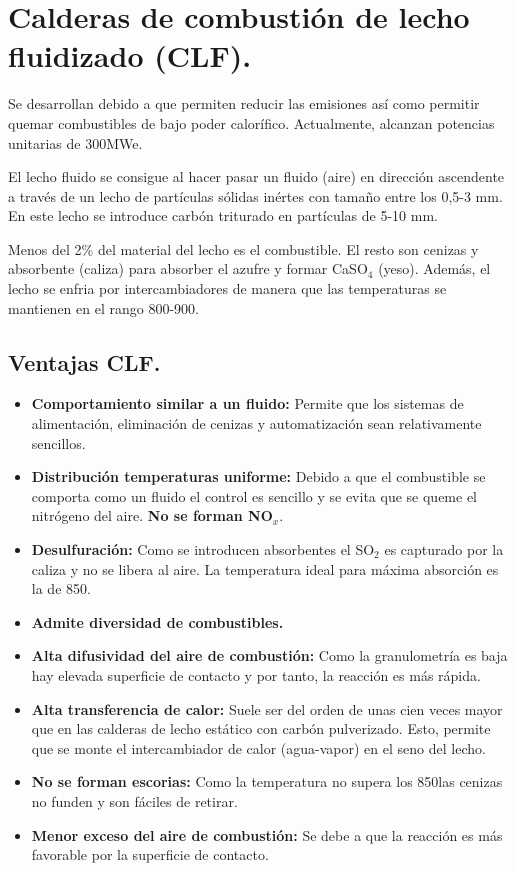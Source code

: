 \section{Calderas de combustión de lecho fluidizado (CLF).}
Se desarrollan debido a que permiten reducir las emisiones así como permitir quemar combustibles de bajo poder calorífico. Actualmente, alcanzan potencias unitarias de 300MWe.

El lecho fluido se consigue al hacer pasar un fluido (aire) en dirección ascendente a través de un lecho de partículas sólidas inértes con tamaño entre los 0,5-3 mm. En este lecho se introduce carbón triturado en partículas de 5-10 mm.

Menos del 2\% del material del lecho es el combustible. El resto son cenizas y absorbente (caliza) para absorber el azufre y formar CaSO$_4$ (yeso). Además, el lecho se enfria por intercambiadores de manera que las temperaturas se mantienen en el rango 800-900\grado.
\subsection{Ventajas CLF.}
\begin{itemize}
	\item \textbf{Comportamiento similar a un fluido:}
		Permite que los sistemas de alimentación, eliminación de cenizas y automatización sean relativamente sencillos.
	\item \textbf{Distribución temperaturas uniforme:}
		Debido a que el combustible se comporta como un fluido el control es sencillo y se evita que se queme el nitrógeno del aire. \textbf{No se forman NO$_x$}.
	\item \textbf{Desulfuración:}
		Como se introducen absorbentes el SO$_2$ es capturado por la caliza y no se libera al aire. La temperatura ideal para máxima absorción es la de 850\grado.
	\item \textbf{Admite diversidad de combustibles.}
	\item \textbf{Alta difusividad del aire de combustión:}
		Como la granulometría es baja hay elevada superficie de contacto y por tanto, la reacción es más rápida.
	\item \textbf{Alta transferencia de calor:}
		Suele ser del orden de unas cien veces mayor que en las calderas de lecho
		estático con carbón pulverizado. Esto, permite que se monte el intercambiador de calor (agua-vapor) en el seno del lecho.
	\item \textbf{No se forman escorias:}
		Como la temperatura no supera los 850\grado las cenizas no funden y son fáciles de retirar.
	\item \textbf{Menor exceso del aire de combustión:}
		Se debe a que la reacción es más favorable por la superficie de contacto.
\end{itemize}
\newpage
